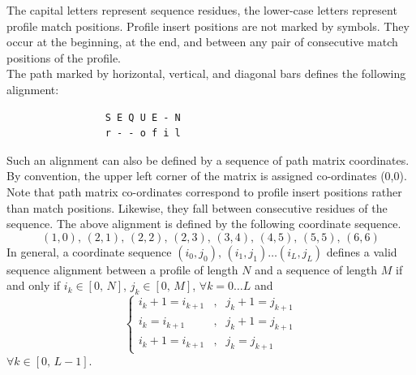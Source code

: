 \documentclass[a4paper,10pt,twoside]{scrartcl}
\begin{document}
  The capital letters represent sequence residues, the lower-case letters represent profile match positions.  Profile insert positions are not
  marked by symbols. They occur at the beginning, at the end, and between any pair of consecutive match positions of the profile.\\
  The path marked by horizontal, vertical, and diagonal bars defines the following alignment:
  \begin{center}
\begin{verbatim}
                 S E Q U E - N
                 r - - o f i l
\end{verbatim}
\end{center}
  Such an alignment can also be defined by a sequence of path matrix coordinates. By convention, the upper left corner of the matrix is assigned
  co-ordinates (0,0). Note that path matrix co-ordinates correspond to profile insert positions rather than match positions. Likewise, they fall
  between consecutive residues of the sequence. The above alignment is defined by the following coordinate sequence.
  \begin{equation*}
     (1,0) ,\, (2,1) ,\, (2,2) ,\, (2,3) ,\, (3,4) ,\, (4,5) ,\, (5,5) ,\, (6,6)
  \end{equation*}
  In general, a coordinate sequence $(i_0,j_0),\, (i_1,j_1) \ldots (i_L, j_L)$ defines a valid sequence alignment between a profile of length $N$
  and a sequence of length $M$ if and only if $i_k \in [0 ,\, N ]$, $j_k \in [0,\, M]$, $\forall k=0\ldots L$ and 
  \begin{equation*}
    \left \{ 
    \begin{array}{ccc}
     i_k + 1 = i_{k+1} &,& j_k + 1 = j_{k+1} \\
     i_k     = i_{k+1} &,& j_k + 1 = j_{k+1} \\
     i_k + 1 = i_{k+1} &,& j_k     = j_{k+1} 
     \end{array}
     \right.
  \end{equation*}
  $\forall k \in \left [0,\, L-1 \right ]$.   
     
\end{document}
